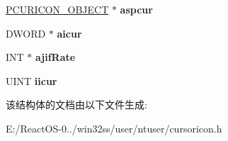 \begin{DoxyCompactItemize}
\hyperlink{struct___c_u_r_i_c_o_n___o_b_j_e_c_t}{P\+C\+U\+R\+I\+C\+O\+N\+\_\+\+O\+B\+J\+E\+CT} $\ast$ {\bfseries aspcur}
\item 
\mbox{\label{structtag_a_c_o_n_a89bd302cbd5d92381103f0f0b41c994e}} 
D\+W\+O\+RD $\ast$ {\bfseries aicur}
\item 
\mbox{\label{structtag_a_c_o_n_aeab96325e533599d6e104e206afc4aec}} 
I\+NT $\ast$ {\bfseries ajif\+Rate}
\item 
\mbox{\label{structtag_a_c_o_n_aed5e4f8aa71967d12e840abc9d3bb797}} 
U\+I\+NT {\bfseries iicur}
\end{DoxyCompactItemize}


该结构体的文档由以下文件生成\+:\begin{DoxyCompactItemize}
\item 
E\+:/\+React\+O\+S-\/0../win32ss/user/ntuser/cursoricon.\+h\end{DoxyCompactItemize}
